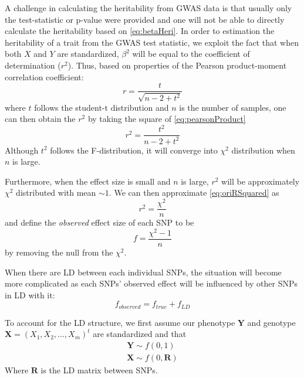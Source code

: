 			A challenge in calculating the heritability from \gls{GWAS} data is that usually only the test-statistic or p-value were provided and one will not be able to directly calculate the heritability based on \cref{eq:betaHeri}. 
			In order to estimation the heritability of a trait from the \gls{GWAS} test statistic, we exploit the fact that when both $X$ and $Y$ are standardized, $\beta^2$ will be equal to the coefficient of determination ($r^2$). 
			Thus, based on properties of the Pearson product-moment correlation coefficient:
			\begin{equation}
				r = \frac{t}{\sqrt{n-2+t^2}}
				\label{eq:pearsonProduct}
			\end{equation}
			where $t$ follows the student-t distribution and $n$ is the number of samples, one can then obtain the $r^2$ by taking the square of \cref{eq:pearsonProduct}
			\begin{equation}
				r^2 = \frac{t^2}{n-2+t^2}
				\label{eq:oriRSquared}
			\end{equation}
			Although $t^2$ follows the F-distribution, it will converge into $\chi^2$ distribution when $n$ is large.
			
			Furthermore, when the effect size is small and $n$ is large, $r^2$ will be approximately $\chi^2$ distributed with mean $\sim 1$. 
			We can then approximate \cref{eq:oriRSquared} as
			\begin{equation}
				r^2= \frac{\chi^2}{n}
				\label{eq:approxChi}
			\end{equation}
			and define the \emph{observed} effect size of each \gls{SNP} to be
			\begin{equation}
			f=\frac{\chi^2-1}{n}
			\label{eq:observedEffect}
			\end{equation}
			by removing the null from the $\chi^2$.
			
			When there are \gls{LD} between each individual \glspl{SNP}, the situation will become more complicated as each \glspl{SNP}' observed effect will be influenced by other \glspl{SNP} in \gls{LD} with it:
			\begin{equation}
			f_{observed} = f_{true}+f_{LD}
			\label{eq:conceptF}
			\end{equation}
			
			To account for the \gls{LD} structure, we first assume our phenotype $\boldsymbol{Y}$ and genotype $\boldsymbol{X}=(X_1,X_2,\dots,X_m)^t$ are standardized and that
			\begin{align*}
				\boldsymbol{Y}\sim f(0,1) \\
				\boldsymbol{X}\sim f(0,\boldsymbol{R})
			\end{align*}
			Where $\boldsymbol{R}$ is the \gls{LD} matrix between \glspl{SNP}.
			
